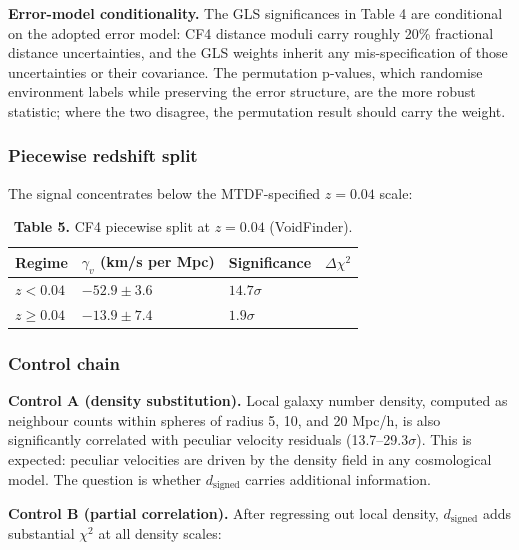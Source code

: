 \documentclass[11pt,a4paper]{article}
\begin{document}
\textbf{Error-model conditionality.} The GLS significances in Table 4 are conditional on the adopted error model: CF4 distance moduli carry roughly 20\% fractional distance uncertainties, and the GLS weights inherit any mis-specification of those uncertainties or their covariance. The permutation p-values, which randomise environment labels while preserving the error structure, are the more robust statistic; where the two disagree, the permutation result should carry the weight.

\subsubsection{Piecewise redshift split}
The signal concentrates below the MTDF-specified \(z = 0.04\) scale:

\begin{table}[H]
\centering
\footnotesize
\caption{\textbf{Table 5.} CF4 piecewise split at \(z = 0.04\) (VoidFinder).}
\begin{tabularx}{\linewidth}{l>{\RaggedRight\arraybackslash}X>{\RaggedRight\arraybackslash}X>{\RaggedRight\arraybackslash}X}
\toprule
\textbf{Regime} & \textbf{\(\gamma_v\) (km/\allowbreak{}s per Mpc)} & \textbf{Significance} & \textbf{\(\Delta\chi^2\)} \tabularnewline
\midrule
\(z < 0.04\) & \(-52.9 \pm 3.6\) & \(14.7\sigma\) & 216 \tabularnewline
\(z \geq 0.04\) & \(-13.9 \pm 7.4\) & \(1.9\sigma\) & 3.5 \tabularnewline
\bottomrule
\end{tabularx}
\end{table}

\subsubsection{Control chain}
\textbf{Control A (density substitution).} Local galaxy number density, computed as neighbour counts within spheres of radius 5, 10, and 20 Mpc/\allowbreak{}h, is also significantly correlated with peculiar velocity residuals (13.7--29.3\(\sigma\)). This is expected: peculiar velocities are driven by the density field in any cosmological model. The question is whether \(d_\mathrm{signed}\) carries additional information.

\textbf{Control B (partial correlation).} After regressing out local density, \(d_\mathrm{signed}\) adds substantial \(\chi^2\) at all density scales:
\end{document}
